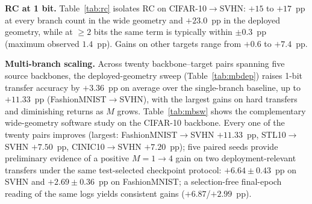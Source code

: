 \documentclass[conference]{IEEEtran}
\begin{document}
\textbf{RC at 1 bit.} Table~\ref{tab:rc} isolates RC on CIFAR-10$\to$SVHN: $+15$ to $+17$~pp at every branch count in the wide geometry and $+23.0$~pp in the deployed geometry, while at ${\geq}2$ bits the same term is typically within $\pm 0.3$~pp (maximum observed $1.4$~pp). Gains on other targets range from $+0.6$ to $+7.4$~pp.

\begin{table}[!t]
\centering
\caption{RC ablation at 1 bit, wide geometry (CIFAR-10 $\to$ SVHN).}
\label{tab:rc}
\small
\setlength{\tabcolsep}{4pt}
\end{table}

\textbf{Multi-branch scaling.} Across twenty backbone--target pairs spanning five source backbones, the deployed-geometry sweep (Table~\ref{tab:mbdep}) raises 1-bit transfer accuracy by $+3.36$~pp on average over the single-branch baseline, up to $+11.33$~pp (FashionMNIST$\to$SVHN), with the largest gains on hard transfers and diminishing returns as $M$ grows. Table~\ref{tab:mbsw} shows the complementary wide-geometry software study on the CIFAR-10 backbone. Every one of the twenty pairs improves (largest: FashionMNIST$\to$SVHN $+11.33$~pp, STL10$\to$SVHN $+7.50$~pp, CINIC10$\to$SVHN $+7.20$~pp); five paired seeds provide preliminary evidence of a positive $M{=}1{\to}4$ gain on two deployment-relevant transfers under the same test-selected checkpoint protocol: $+6.64\pm0.43$~pp on SVHN and $+2.69\pm0.36$~pp on FashionMNIST; a selection-free final-epoch reading of the same logs yields consistent gains ($+6.87$/$+2.99$~pp).
\end{document}
